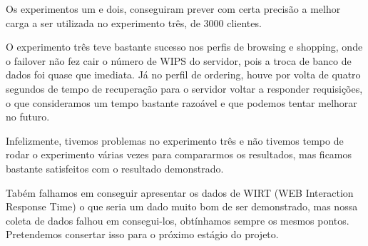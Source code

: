 \documentclass[11pt,twoside]{article}
\begin{document}
Os experimentos um e dois, conseguiram prever com certa precisão a melhor carga a ser utilizada no experimento três, de 3000 clientes.

O experimento três teve bastante sucesso nos perfis de browsing e shopping, onde o failover não fez cair o número de WIPS do servidor, pois a troca de banco de dados foi quase que imediata. Já no perfil de ordering, houve por volta de quatro segundos de tempo de recuperação para o servidor voltar a responder requisições, o que consideramos um tempo bastante razoável e que podemos tentar melhorar no futuro.

Infelizmente, tivemos problemas no experimento três e não tivemos tempo de rodar o experimento várias vezes para compararmos os resultados, mas ficamos bastante satisfeitos com o resultado demonstrado.

Tabém falhamos em conseguir apresentar os dados de WIRT (WEB Interaction Response Time) o que seria um dado muito bom de ser demonstrado, mas nossa coleta de dados falhou em consegui-los, obtínhamos sempre os mesmos pontos. Pretendemos consertar isso para o próximo estágio do projeto.
\end{document}
